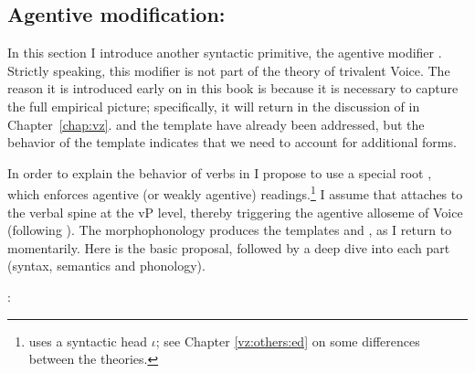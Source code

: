 \begin{exe}
\begin{xlist}
\begin{exe}
\begin{xlist}
\begin{exe}
\begin{xlist}
\begin{exe}
\begin{exe}
\begin{xlist}
\begin{exe}
\begin{xlist}
\begin{exe}
\begin{xlist}
\begin{exe}
\begin{xlist}
\begin{exe}
\begin{xlist}
\begin{exe}
\begin{xlist}
\begin{exe}
\begin{xlist}
\begin{exe}
\begin{xlist}
\begin{exe}
\begin{xlist}
\begin{exe}
\begin{xlist}
\begin{exe}
\begin{xlist}
\begin{exe}
\begin{xlist}
\begin{exe}
\begin{exe}
\begin{xlist}
\begin{exe}
\begin{xlist}
\begin{exe}
\begin{xlist}
\begin{exe}
\begin{xlist}
{\begin{exe}
\begin{xlist}
\begin{exe}
\begin{xlist}
\begin{exe}
\begin{xlist}
\begin{exe}
\begin{xlist}
\begin{xlist}
\begin{xlist}
\begin{exe}
\begin{xlist}
\begin{xlist}
\begin{xlist}
\begin{exe}
\begin{exe}
\begin{xlist}
\begin{exe}
\begin{xlist}
\begin{exe}
\begin{xlist}
\begin{exe}
\begin{xlist}
\begin{exe}
\begin{xlist}
\begin{exe}
\begin{xlist}
\begin{exe}
\begin{exe}
\begin{xlist}
\begin{xlist}
\begin{exe}
\begin{xlist}
\begin{exe}
\begin{xlist}
\begin{exe}
\begin{xlist}
\begin{exe}
\begin{xlist}
\section{Agentive modification: \va} \label{voice:va}
In this section I introduce another syntactic primitive, the agentive modifier {\va}. Strictly speaking, this modifier is not part of the theory of trivalent Voice. The reason it is introduced early on in this book is because it is necessary to capture the full empirical picture; specifically, it will return in the discussion of {\vz} in Chapter~\ref{chap:vz}.  and the template {\tkal} have already been addressed, but the behavior of the template {\tpie} indicates that we need to account for additional forms.

In order to explain the behavior of verbs in {\tpie} I propose to use a special root {\va}, which enforces agentive (or weakly agentive) readings.\footnote{\cite{doron03} uses a syntactic head $\iota$; see Chapter \ref{vz:others:ed} on some differences between the theories.} I assume that {\va} attaches to the verbal spine at the vP level, thereby triggering the agentive alloseme of Voice (following \citealt{doron03,doron14adj}). The morphophonology produces the templates {\tpie} and {\thit}, as I return to momentarily. Here is the basic proposal, followed by a deep dive into each part (syntax, semantics and phonology).
 \begin{exe}
 \ex  {\va}: 

\end{exe}
\end{xlist}
\end{exe}
\end{xlist}
\end{exe}
\end{xlist}
\end{exe}
\end{xlist}
\end{exe}
\end{xlist}
\end{xlist}
\end{exe}
\end{exe}
\end{xlist}
\end{exe}
\end{xlist}
\end{exe}
\end{xlist}
\end{exe}
\end{xlist}
\end{exe}
\end{xlist}
\end{exe}
\end{xlist}
\end{exe}
\end{exe}
\end{xlist}
\end{xlist}
\end{xlist}
\end{exe}
\end{xlist}
\end{xlist}
\end{xlist}
\end{exe}
\end{xlist}
\end{exe}
\end{xlist}
\end{exe}
\end{xlist}
\end{exe}}
\end{xlist}
\end{exe}
\end{xlist}
\end{exe}
\end{xlist}
\end{exe}
\end{xlist}
\end{exe}
\end{exe}
\end{xlist}
\end{exe}
\end{xlist}
\end{exe}
\end{xlist}
\end{exe}
\end{xlist}
\end{exe}
\end{xlist}
\end{exe}
\end{xlist}
\end{exe}
\end{xlist}
\end{exe}
\end{xlist}
\end{exe}
\end{xlist}
\end{exe}
\end{xlist}
\end{exe}
\end{xlist}
\end{exe}
\end{xlist}
\end{exe}
\end{exe}
\end{xlist}
\end{exe}
\end{xlist}
\end{exe}
\end{xlist}
\end{exe}
